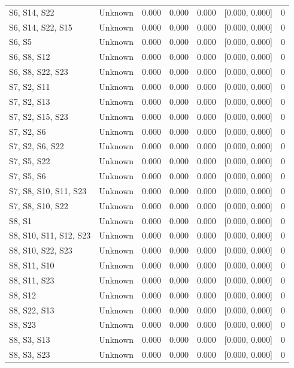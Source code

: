 \begin{table}[h]
\begin{tabular}{llccccr}
S6, S14, S22 & Unknown & 0.000 & 0.000 & 0.000 & [0.000, 0.000] & 0 \\
S6, S14, S22, S15 & Unknown & 0.000 & 0.000 & 0.000 & [0.000, 0.000] & 0 \\
S6, S5 & Unknown & 0.000 & 0.000 & 0.000 & [0.000, 0.000] & 0 \\
S6, S8, S12 & Unknown & 0.000 & 0.000 & 0.000 & [0.000, 0.000] & 0 \\
S6, S8, S22, S23 & Unknown & 0.000 & 0.000 & 0.000 & [0.000, 0.000] & 0 \\
S7, S2, S11 & Unknown & 0.000 & 0.000 & 0.000 & [0.000, 0.000] & 0 \\
S7, S2, S13 & Unknown & 0.000 & 0.000 & 0.000 & [0.000, 0.000] & 0 \\
S7, S2, S15, S23 & Unknown & 0.000 & 0.000 & 0.000 & [0.000, 0.000] & 0 \\
S7, S2, S6 & Unknown & 0.000 & 0.000 & 0.000 & [0.000, 0.000] & 0 \\
S7, S2, S6, S22 & Unknown & 0.000 & 0.000 & 0.000 & [0.000, 0.000] & 0 \\
S7, S5, S22 & Unknown & 0.000 & 0.000 & 0.000 & [0.000, 0.000] & 0 \\
S7, S5, S6 & Unknown & 0.000 & 0.000 & 0.000 & [0.000, 0.000] & 0 \\
S7, S8, S10, S11, S23 & Unknown & 0.000 & 0.000 & 0.000 & [0.000, 0.000] & 0 \\
S7, S8, S10, S22 & Unknown & 0.000 & 0.000 & 0.000 & [0.000, 0.000] & 0 \\
S8, S1 & Unknown & 0.000 & 0.000 & 0.000 & [0.000, 0.000] & 0 \\
S8, S10, S11, S12, S23 & Unknown & 0.000 & 0.000 & 0.000 & [0.000, 0.000] & 0 \\
S8, S10, S22, S23 & Unknown & 0.000 & 0.000 & 0.000 & [0.000, 0.000] & 0 \\
S8, S11, S10 & Unknown & 0.000 & 0.000 & 0.000 & [0.000, 0.000] & 0 \\
S8, S11, S23 & Unknown & 0.000 & 0.000 & 0.000 & [0.000, 0.000] & 0 \\
S8, S12 & Unknown & 0.000 & 0.000 & 0.000 & [0.000, 0.000] & 0 \\
S8, S22, S13 & Unknown & 0.000 & 0.000 & 0.000 & [0.000, 0.000] & 0 \\
S8, S23 & Unknown & 0.000 & 0.000 & 0.000 & [0.000, 0.000] & 0 \\
S8, S3, S13 & Unknown & 0.000 & 0.000 & 0.000 & [0.000, 0.000] & 0 \\
S8, S3, S23 & Unknown & 0.000 & 0.000 & 0.000 & [0.000, 0.000] & 0 \\

\end{tabular}
\end{table}
